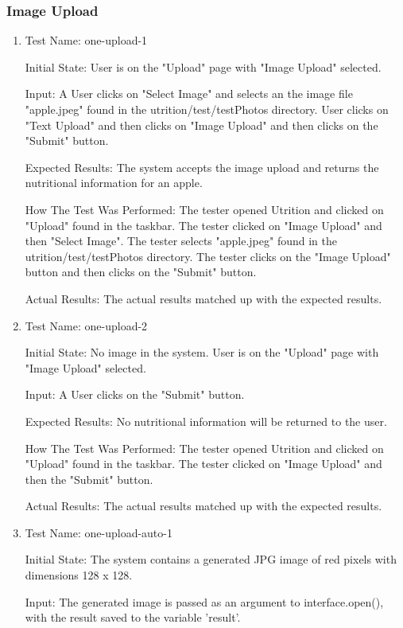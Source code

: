 \documentclass[12pt, titlepage]{article}
\begin{document}
	\subsubsection{Image Upload}
	\begin{enumerate}
		\item{Test Name: one-upload-1}
		
		Initial State: User is on the "Upload" page with "Image Upload" selected.
		
		Input: A User clicks on "Select Image" and selects an the image file "apple.jpeg" found in the utrition/test/testPhotos directory. User clicks on "Text Upload" and then clicks on "Image Upload" and then clicks on the "Submit" button.
		
		Expected Results: The system accepts the image upload and returns the nutritional information for an apple. 
		
		How The Test Was Performed: The tester opened Utrition and clicked on "Upload" found in the taskbar. The tester clicked on "Image Upload" and then "Select Image". The tester selects "apple.jpeg" found in the utrition/test/testPhotos directory. The tester clicks on the "Image Upload" button and then clicks on the "Submit" button.
		
		Actual Results: The actual results matched up with the expected results. 
		
		\item{Test Name: one-upload-2}
		
		Initial State: No image in the system. User is on the "Upload" page with "Image Upload" selected.
		
		Input: A User clicks on the "Submit" button.
		
		Expected Results: No nutritional information will be returned to the user.
		
		How The Test Was Performed: The tester opened Utrition and clicked on "Upload" found in the taskbar. The tester clicked on "Image Upload" and then the "Submit" button.
		
		Actual Results: The actual results matched up with the expected results.

		\item{Test Name: one-upload-auto-1}
		
		Initial State: The system contains a generated JPG image of red pixels with dimensions 128 x 128.
		
		Input: The generated image is passed as an argument to interface.open(), with the result saved to the variable 'result'.
		

\end{enumerate}
\end{document}
